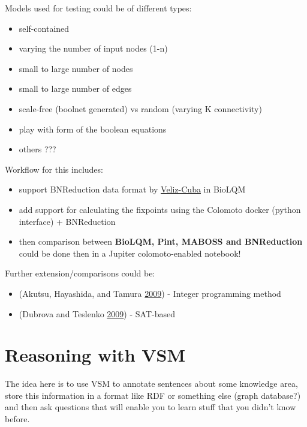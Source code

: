 \documentclass[
  12pt,
]{book}
\providecommand{\tightlist}{%
  \setlength{\itemsep}{0pt}\setlength{\parskip}{0pt}}
\begin{document}
Models used for testing could be of different types:

\begin{itemize}
\tightlist
\item
  self-contained
\item
  varying the number of input nodes (1-n)
\item
  small to large number of nodes
\item
  small to large number of edges
\item
  scale-free (boolnet generated) vs random (varying K connectivity)
\item
  play with form of the boolean equations
\item
  others ???
\end{itemize}

Workflow for this includes:

\begin{itemize}
\tightlist
\item
  support BNReduction data format by \href{https://doi.org/10.1186/1471-2105-15-221}{Veliz-Cuba}
  in BioLQM
\item
  add support for calculating the fixpoints using the Colomoto docker (python
  interface) + BNReduction
\item
  then comparison between \textbf{BioLQM, Pint, MABOSS and BNReduction} could be done then
  in a Jupiter colomoto-enabled notebook!
\end{itemize}

Further extension/comparisons could be:

\begin{itemize}
\tightlist
\item
  (Akutsu, Hayashida, and Tamura \protect\hyperlink{ref-Akutsu2009}{2009}) - Integer programming method
\item
  (Dubrova and Teslenko \protect\hyperlink{ref-Dubrova2009}{2009}) - SAT-based
\end{itemize}

\hypertarget{reasoning-with-vsm}{%
\section{Reasoning with VSM}\label{reasoning-with-vsm}}

The idea here is to use VSM to annotate sentences about some knowledge area,
store this information in a format like RDF or something else (graph database?)
and then ask questions that will enable you to learn stuff that you didn't know
before.
\end{document}
